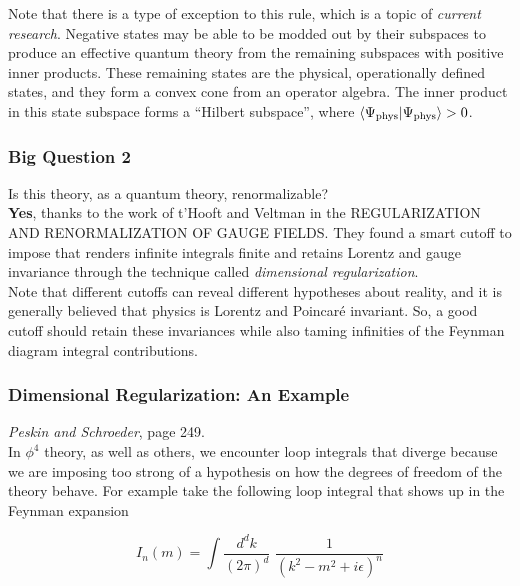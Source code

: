 \noindent Note that there is a type of exception to this rule, which is a topic of \textit{current research}. Negative states may be able to be modded out by their subspaces to produce an effective quantum theory from the remaining subspaces with positive inner products. These remaining states are the physical, operationally defined states, and they form a convex cone from an operator algebra. The inner product in this state subspace forms a ``Hilbert subspace'', where $\braket{\Psi_{\text{phys}} | \Psi_{\text{phys}}} > 0$. \\

\subsubsection*{Big Question 2}

\noindent Is this theory, as a quantum theory, renormalizable? \\

\noindent \textbf{Yes}, thanks to the work of t'Hooft and Veltman in the REGULARIZATION AND RENORMALIZATION OF GAUGE FIELDS. They found a smart cutoff to impose that renders infinite integrals finite and retains Lorentz and gauge invariance through the technique called \textit{dimensional regularization}.\\

\noindent Note that different cutoffs can reveal different hypotheses about reality, and it is generally believed that physics is Lorentz and Poincar\'e invariant. So, a good cutoff should retain these invariances while also taming infinities of the Feynman diagram integral contributions. \\

\subsubsection*{Dimensional Regularization: An Example}

\textit{Peskin and Schroeder}, page 249. \\

\noindent In $\phi^4$ theory, as well as others, we encounter loop integrals that diverge because we are imposing too strong of a hypothesis on how the degrees of freedom of the theory behave. For example take the following loop integral that shows up in the Feynman expansion

\begin{equation}
I_n(m) = \int \frac{d^d k}{(2\pi)^d} \,\, \frac{1}{(k^2 - m^2 + i \epsilon)^n}
\end{equation}

